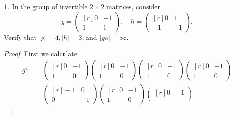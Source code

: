 \documentclass{article}
\theoremstyle{definition}
\newtheorem{ex}{}[section]
\begin{document}
\begin{ex}
	In the group of invertible $2 \times 2$ matrices, consider \begin{equation*}
		g = \begin{pmatrix*}[r]
			0 & -1 \\
			1 & 0
		\end{pmatrix*},\hspace{1em}h = \begin{pmatrix*}[r]
			0  & 1  \\
			-1 & -1
		\end{pmatrix*}.
	\end{equation*}
	Verify that $|g| = 4, |h| = 3$, and $|gh| = \infty$.
\end{ex}
\begin{proof}
	First we calculate \begin{align*}
		g^4 & = \begin{pmatrix*}[r]
			        0 & -1 \\
			        1 & 0
		        \end{pmatrix*}\begin{pmatrix*}[r]
			                      0 & -1 \\
			                      1 & 0
		                      \end{pmatrix*}\begin{pmatrix*}[r]
			                                    0 & -1 \\
			                                    1 & 0
		                                    \end{pmatrix*}\begin{pmatrix*}[r]
			                                                  0 & -1 \\
			                                                  1 & 0
		                                                  \end{pmatrix*} \\
		    & = \begin{pmatrix*}[r]
			        -1 & 0 \\
			        0 & -1
		        \end{pmatrix*}\begin{pmatrix*}[r]
			                      0 & -1 \\
			                      1 & 0
		                      \end{pmatrix*}\begin{pmatrix*}[r]
			                                    0 & -1 \\

\end{pmatrix*}
\end{align*}
\end{proof}
\end{document}
